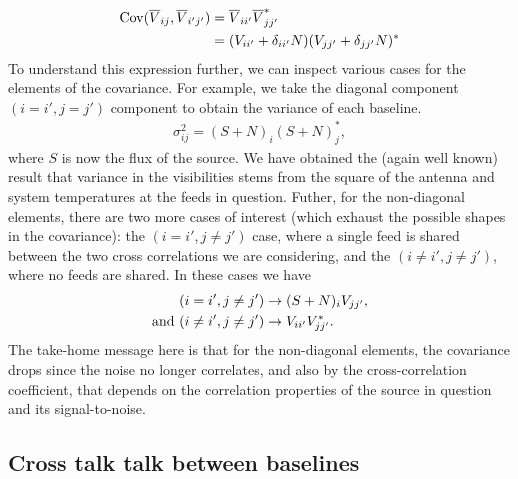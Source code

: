\begin{align}
{\rm Cov}(\overline{V}_{ij}, \overline{V}_{i'j'}) &= \overline{V}_{ii'}\overline{V}_{jj'}^*  \label{fullcov-obsvis}
\\ & = (V_{ii'} + \delta_{ii'} N)(V_{jj'} + \delta_{jj'} N)^*
\end{align}
To understand this expression further, we can inspect various cases for the elements of the covariance. For example, we take the diagonal component $(i=i', j=j')$ component to obtain the variance of each baseline.
\begin{align}
\sigma^2_{ij} = (S + N)_{i}(S + N)^*_{j},
\end{align}
where $S$ is now the flux of the source. We have obtained the (again well known) result that variance in the visibilities stems from the square of the antenna and system temperatures at the feeds in question. Futher, for the non-diagonal elements, there are two more cases of interest (which exhaust the possible shapes in the covariance): the $(i=i', j\neq j')$ case, where a single feed is shared between the two cross correlations we are considering, and the $(i\neq i', j\neq j')$, where no feeds are shared. In these cases we have
\begin{align}
(i=i', j\neq j') &\rightarrow (S + N)_{i} V_{jj'},
\\{\rm and~}(i\neq i', j\neq j') &\rightarrow V_{ii'} V^{*}_{jj'}.
\end{align}
The take-home message here is that for the non-diagonal elements, the covariance drops since the noise no longer correlates, and also by the cross-correlation coefficient, that depends on the correlation properties of the source in question and its signal-to-noise.

\subsection{Cross talk talk between baselines} 
\label{app:hol:sec:noise:ss:basecalcx}

